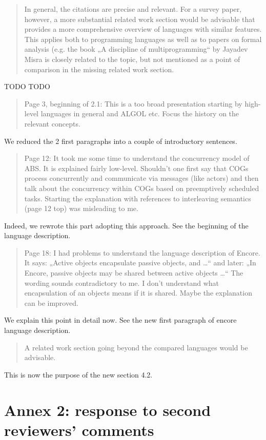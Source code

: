 \documentclass{article}
\begin{document}
\begin{quote}
	In general, the citations are precise and relevant. For a survey paper, however, a 
	more 
substantial related work section would be advisable that provides a more comprehensive 
overview of languages with similar features. This applies both to programming languages 
as well as to papers on formal analysis (e.g. the book „A discipline of multiprogramming“ 
by Jayadev Misra is closely related to the topic, but not mentioned as a point of 
comparison in the missing related work section. 
\end{quote}
TODO TODO

\begin{quote}
 Page 3, beginning of 2.1: This is a too broad presentation starting by high-level 
languages in general and ALGOL etc. Focus the history on the relevant concepts.
\end{quote}
We reduced the 2 first paragraphs into a couple of introductory sentences.


\begin{quote}
Page 12: It took me some time to understand the concurrency model of ABS. It is 
explained fairly low-level. Shouldn’t one first say that COGs process concurrently and 
communicate via messages (like actors) and then talk about the concurrency within COGs 
based on preemptively scheduled tasks. Starting the explanation with references to 
interleaving semantics (page 12 top) was misleading to me. 
\end{quote}
Indeed, we rewrote this part adopting this approach. See the beginning of the language 
description.

\begin{quote} Page 18: I had problems to understand the language description of Encore. 
It says: 
„Active objects encapsulate passive objects, and …“ and later: „In Encore, passive 
objects may be shared between active objects …“ The wording sounds contradictory to me. I 
don’t understand what encapsulation of an objects means if it is shared. Maybe the 
explanation can be improved.
\end{quote}
We explain this point in detail now.
See the new first paragraph of encore language description.


\begin{quote}
 A related work section going beyond the compared languages would be advisable.
\end{quote}
This is now the purpose of the new section 4.2.

\section*{Annex 2: response to second reviewers' comments}
\end{document}
